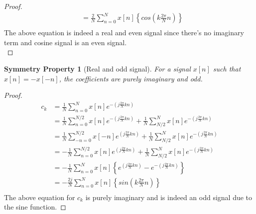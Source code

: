 \documentclass{home_assignment}
\newtheorem{subtheorem}{Symmetry Property}[theorem]
\begin{document}
{\begin{proof}
$$\begin{aligned}
&=\frac{2}{N} \sum_{n=0}^{N} x[n]\left\lbrace cos\left(k\frac{2\pi}{N}n\right)\right\rbrace\\
\end{aligned}
$$
The above equation is indeed a real and even signal since there's no imaginary term and cosine signal is an even signal.\\
\end{proof}
\begin{subtheorem}[Real and odd signal]
For a signal $x[n]$ such that $x[n]=-x[-n]$, the coefficients are purely imaginary and odd.
\end{subtheorem}
\begin{proof}
$$
\begin{aligned}
c_k&=\frac{1}{N} \sum_{n=0}^{N} x[n] e^{-\left(j \frac{2 \pi}{N} k n\right)}\\
&=\frac{1}{N} \sum_{n=0}^{N/2} x[n] e^{-\left(j \frac{2 \pi}{N} k n\right)}+\frac{1}{N} \sum_{N/2}^{N} x[n] e^{-\left(j \frac{2 \pi}{N} k n\right)}\\
&=\frac{1}{N} \sum_{-n=0}^{N/2} x[-n] e^{\left(j \frac{2 \pi}{N} k n\right)}+\frac{1}{N} \sum_{N/2}^{N} x[n] e^{-\left(j \frac{2 \pi}{N} k n\right)}\\
&=-\frac{1}{N} \sum_{n=0}^{N/2} x[n] e^{\left(j \frac{2 \pi}{N} k n\right)}+\frac{1}{N} \sum_{N/2}^{N} x[n] e^{-\left(j \frac{2 \pi}{N} k n\right)}\\
&=-\frac{1}{N} \sum_{n=0}^{N} x[n] \left\lbrace e^{\left(j \frac{2 \pi}{N} k n\right)}-e^{-\left(j \frac{2 \pi}{N} k n\right)}\right\rbrace\\
&=-\frac{2j}{N} \sum_{n=0}^{N} x[n]\left\lbrace sin\left(k\frac{2\pi}{N}n\right)\right\rbrace\\
\end{aligned}
$$
The above equation for $c_k$ is purely imaginary and is indeed an odd signal due to the sine function.
\end{proof}
}
\end{document}
